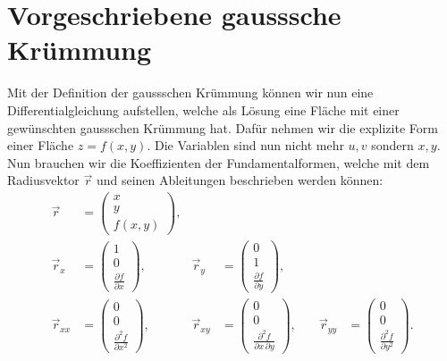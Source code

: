 %
%
%
%
\section{Vorgeschriebene gausssche Krümmung
\label{mongeampere:section:teil2}}
Mit der Definition der gaussschen Krümmung können wir nun eine Differentialgleichung aufstellen,
welche als Lösung eine Fläche mit einer gewünschten gaussschen Krümmung hat.
Dafür nehmen wir die explizite Form einer Fläche $z = f(x,y)$.
Die Variablen sind nun nicht mehr $u, v$ sondern $x, y$.
Nun brauchen wir die Koeffizienten der Fundamentalformen, welche mit dem Radiusvektor $\vec r$ und seinen Ableitungen 
beschrieben werden können:
\begin{equation*}
\begin{aligned}
  \vec r &= \begin{pmatrix}
   x \\
   y \\
   f(x, y)
 \end{pmatrix}, \\
    \vec r_x &= \begin{pmatrix}
      1 \\
      0 \\
      \frac{\partial f}{\partial x}
    \end{pmatrix},
      \quad &
    \vec r_y &= \begin{pmatrix}
      0 \\
      1 \\
      \frac{\partial f}{\partial y}
    \end{pmatrix},\\
      \vec r_{xx} &= \begin{pmatrix}
      0 \\
      0 \\
      \frac{\partial^2 f}{\partial x^2}
    \end{pmatrix},
    \quad &
    \vec r_{xy} &= \begin{pmatrix}
      0 \\
      0 \\
      \frac{\partial^2 f}{\partial x \, \partial y}
    \end{pmatrix},
      \quad &
    \vec r_{yy} &= \begin{pmatrix}
      0 \\
      0 \\
      \frac{\partial^2 f}{\partial y^2}
    \end{pmatrix}.
\end{aligned}
\end{equation*}
